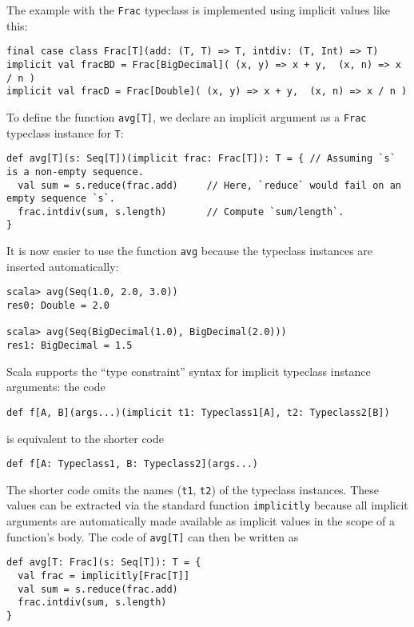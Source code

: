 The example with the \lstinline!Frac! typeclass is implemented using
implicit values like this:
\begin{lstlisting}
final case class Frac[T](add: (T, T) => T, intdiv: (T, Int) => T)
implicit val fracBD = Frac[BigDecimal]( (x, y) => x + y,  (x, n) => x / n )
implicit val fracD = Frac[Double]( (x, y) => x + y,  (x, n) => x / n )
\end{lstlisting}
To define the function \lstinline!avg[T]!, we declare an implicit
argument as a \lstinline!Frac! typeclass instance for \lstinline!T!:
\begin{lstlisting}
def avg[T](s: Seq[T])(implicit frac: Frac[T]): T = { // Assuming `s` is a non-empty sequence.
  val sum = s.reduce(frac.add)     // Here, `reduce` would fail on an empty sequence `s`.
  frac.intdiv(sum, s.length)       // Compute `sum/length`.
}
\end{lstlisting}
It is now easier to use the function \lstinline!avg! because the
typeclass instances are inserted automatically:
\begin{lstlisting}
scala> avg(Seq(1.0, 2.0, 3.0))
res0: Double = 2.0

scala> avg(Seq(BigDecimal(1.0), BigDecimal(2.0)))
res1: BigDecimal = 1.5
\end{lstlisting}

Scala supports the ``type constraint'' syntax for implicit typeclass
instance arguments: the code
\begin{lstlisting}
def f[A, B](args...)(implicit t1: Typeclass1[A], t2: Typeclass2[B])
\end{lstlisting}
is equivalent to the shorter code 
\begin{lstlisting}
def f[A: Typeclass1, B: Typeclass2](args...)
\end{lstlisting}
The shorter code omits the names (\lstinline!t1!, \lstinline!t2!)
of the typeclass instances. These values can be extracted via the
standard function \lstinline!implicitly! because all implicit arguments
are automatically made available as implicit values in the scope of
a function's body. The code of \lstinline!avg[T]! can then be written
as
\begin{lstlisting}
def avg[T: Frac](s: Seq[T]): T = {
  val frac = implicitly[Frac[T]]
  val sum = s.reduce(frac.add)
  frac.intdiv(sum, s.length)
}
\end{lstlisting}

